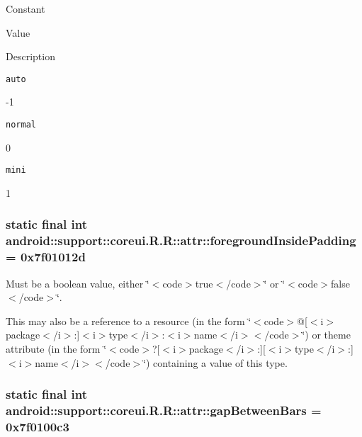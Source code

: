 Constant

Value

Description 

{\tt auto}

-1

{\tt normal}

0

{\tt mini}

1\hypertarget{classandroid_1_1support_1_1coreui_1_1_r_1_1attr_b1e9a39233fc388de8a111ca77315de1}{
\subsubsection[{foregroundInsidePadding}]{\setlength{\rightskip}{0pt plus 5cm}static final int android::support::coreui.R.R::attr::foregroundInsidePadding = 0x7f01012d}}
\label{classandroid_1_1support_1_1coreui_1_1_r_1_1attr_b1e9a39233fc388de8a111ca77315de1}


Must be a boolean value, either \char`\"{}$<$code$>$true$<$/code$>$\char`\"{} or \char`\"{}$<$code$>$false$<$/code$>$\char`\"{}. 

This may also be a reference to a resource (in the form \char`\"{}$<$code$>$@\mbox{[}$<$i$>$package$<$/i$>$:\mbox{]}$<$i$>$type$<$/i$>$:$<$i$>$name$<$/i$>$$<$/code$>$\char`\"{}) or theme attribute (in the form \char`\"{}$<$code$>$?\mbox{[}$<$i$>$package$<$/i$>$:\mbox{]}\mbox{[}$<$i$>$type$<$/i$>$:\mbox{]}$<$i$>$name$<$/i$>$$<$/code$>$\char`\"{}) containing a value of this type. \hypertarget{classandroid_1_1support_1_1coreui_1_1_r_1_1attr_b1e9616161f3bde466b4fa10ec4bcfa3}{
\subsubsection[{gapBetweenBars}]{\setlength{\rightskip}{0pt plus 5cm}static final int android::support::coreui.R.R::attr::gapBetweenBars = 0x7f0100c3}}
\label{classandroid_1_1support_1_1coreui_1_1_r_1_1attr_b1e9616161f3bde466b4fa10ec4bcfa3}


